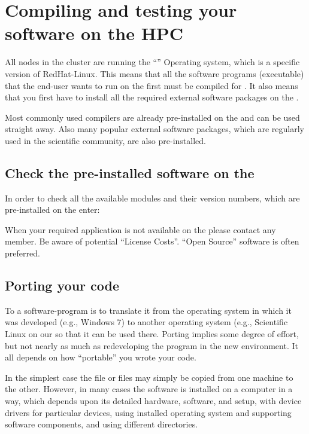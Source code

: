 \chapter{Compiling and testing your software on the HPC}

All nodes in the \hpc cluster are running the ``\operatingsystem'' Operating
system, which is a specific version of RedHat-Linux. This means that all the
software programs (executable) that the end-user wants to run on the \hpc first
must be compiled for \operatingsystem.  It also means that you first have to
install all the required external software packages on the \hpc.

Most commonly used compilers are already pre-installed on the \hpc and can
be used straight away. Also many popular external software packages, which are
regularly used in the scientific community, are also pre-installed.

\section{Check the pre-installed software on the \hpc}

In order to check all the available modules and their version numbers, which
are pre-installed on the \hpc enter:


When your required application is not available on the \hpc please contact any
\hpc member. Be aware of potential ``License Costs''.  ``Open Source'' software
is often preferred.

\section{Porting your code}

To  a software-program is to translate it from the operating
system in which it was developed (e.g., Windows 7) to another operating system
(e.g., Scientific Linux on our \hpc so that it can be used there. Porting
implies some degree of effort, but not nearly as much as redeveloping the
program in the new environment.  It all depends on how ``portable'' you wrote
your code.

In the simplest case the file or files may simply be copied from one machine to
the other. However, in many cases the software is installed on a computer in a
way, which depends upon its detailed hardware, software, and setup, with device
drivers for particular devices, using installed operating system and supporting
software components, and using different directories.

